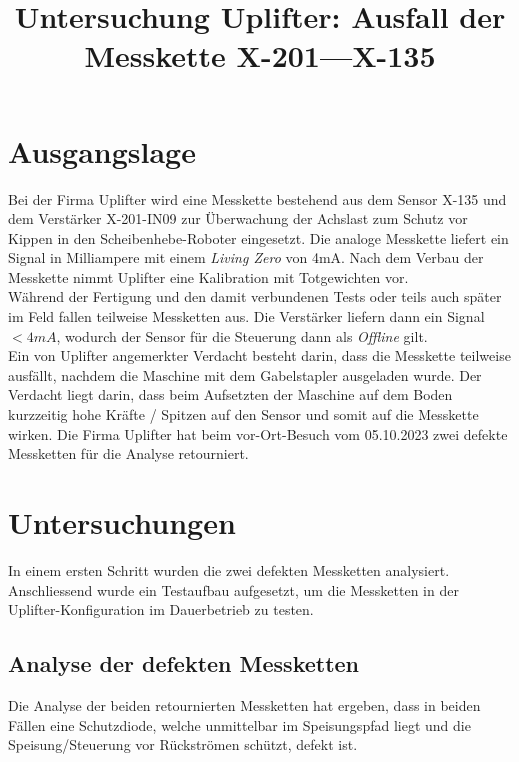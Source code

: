 \documentclass[12pt,a4paper]{article}
\title{Untersuchung Uplifter: Ausfall der Messkette X-201---X-135}
\begin{document}
	\maketitle
	\newpage
	\section{Ausgangslage}
	Bei der Firma Uplifter wird eine Messkette bestehend aus dem Sensor X-135 und dem Verstärker X-201-IN09 zur Überwachung der Achslast zum Schutz vor Kippen in den Scheibenhebe-Roboter eingesetzt. Die analoge Messkette liefert ein Signal in Milliampere mit einem \textit{Living Zero} von 4mA. Nach dem Verbau der Messkette nimmt Uplifter eine Kalibration mit Totgewichten vor. \\
	Während der Fertigung und den damit verbundenen Tests oder teils auch später im Feld fallen teilweise Messketten aus. Die Verstärker liefern dann ein Signal $< 4mA$, wodurch der Sensor für die Steuerung dann als \textit{Offline} gilt.\\
	Ein von Uplifter angemerkter Verdacht besteht darin, dass die Messkette teilweise ausfällt, nachdem die Maschine mit dem Gabelstapler ausgeladen wurde. Der Verdacht liegt darin, dass beim Aufsetzten der Maschine auf dem Boden kurzzeitig hohe Kräfte / Spitzen auf den Sensor und somit auf die Messkette wirken.
	Die Firma Uplifter hat beim vor-Ort-Besuch vom 05.10.2023 zwei defekte Messketten für die Analyse retourniert.
	\section{Untersuchungen}
	In einem ersten Schritt wurden die zwei defekten Messketten analysiert. Anschliessend wurde ein Testaufbau aufgesetzt, um die Messketten in der Uplifter-Konfiguration im Dauerbetrieb zu testen.
	\subsection{Analyse der defekten Messketten}
	Die Analyse der beiden retournierten Messketten hat ergeben, dass in beiden Fällen eine Schutzdiode, welche unmittelbar im Speisungspfad liegt und die Speisung/Steuerung vor Rückströmen schützt, defekt ist. 
\end{document}
